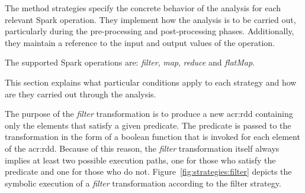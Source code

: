 \label{subsec:module:strategies}

The method strategies specify the concrete behavior of the analysis for each relevant Spark operation. They implement how the analysis is to be carried out, particularly during the pre-processing and post-processing phases. Additionally, they maintain a reference to the input and output values of the operation.

The supported Spark operations are: \textit{filter}, \textit{map}, \textit{reduce} and \textit{flatMap}.

This section explains what particular conditions apply to each strategy and how are they carried out through the analysis.


The purpose of the \textit{filter} transformation is to produce a new \acrshort{acr:rdd} containing only the elements that satisfy a given predicate. The predicate is passed to the transformation in the form of a boolean function that is invoked for each element of the \acrshort{acr:rdd}. Because of this reason, the \textit{filter} transformation itself always implies at least two possible execution paths, one for those who satisfy the predicate and one for those who do not. Figure~\ref{fig:strategies:filter} depicts the symbolic execution of a \textit{filter} transformation according to the filter strategy.

